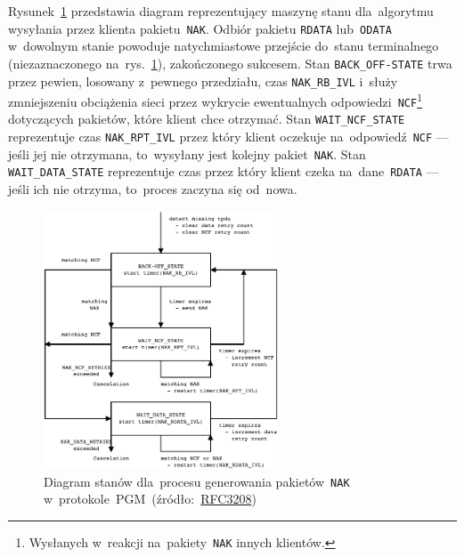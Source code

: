 \documentclass[thesis]{subfiles}
\begin{document}
Rysunek~\ref{fig:NAKflow} przedstawia diagram reprezentujący maszynę stanu dla~algorytmu wysyłania przez klienta pakietu~\texttt{NAK}. Odbiór pakietu \texttt{RDATA} lub~\texttt{ODATA} w~dowolnym stanie powoduje natychmiastowe przejście do~stanu terminalnego (niezaznaczonego na~rys.~\ref{fig:NAKflow}), zakończonego sukcesem. Stan \texttt{BACK\_OFF-STATE} trwa przez pewien, losowany z~pewnego przedziału, czas \texttt{NAK\_RB\_IVL} i~służy zmniejszeniu obciążenia sieci przez wykrycie ewentualnych odpowiedzi~\texttt{NCF}\footnote{Wysłanych w~reakcji na~pakiety~\texttt{NAK} innych klientów.} dotyczących pakietów, które klient chce otrzymać. Stan \texttt{WAIT\_NCF\_STATE} reprezentuje czas \texttt{NAK\_RPT\_IVL} przez który klient oczekuje na~odpowiedź~\texttt{NCF} --- jeśli jej nie otrzymana, to~wysyłany jest kolejny pakiet~\texttt{NAK}. Stan \texttt{WAIT\_DATA\_STATE} reprezentuje czas przez który klient czeka na~dane~\texttt{RDATA} --- jeśli ich nie otrzyma, to~proces zaczyna się od~nowa.

\begin{figure}
	\centering
	\includegraphics[width=0.62\textwidth]{img/PGF_protocol_NAK_flow_diagram}
	\caption{Diagram stanów dla~procesu generowania pakietów~\texttt{NAK} w~protokole~PGM~(źródło:~\href{https://tools.ietf.org/html/rfc3208\#page-25}{RFC3208})~\cite{pgm-rfc}}
	\label{fig:NAKflow}
\end{figure}
\end{document}
